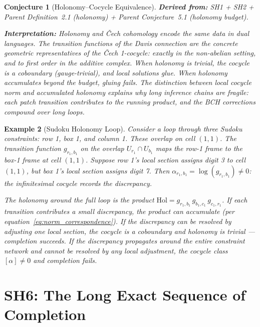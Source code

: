 \documentclass[11pt,letterpaper]{article}
\newtheorem{conjecture}{Conjecture}[section]
\newtheorem{example}[conjecture]{Example}
\newcommand{\Hol}{\mathrm{Hol}}
\begin{document}
\begin{conjecture}[Holonomy--Cocycle 
Equivalence]
\textbf{Derived from:} SH1 + SH2 + Parent Definition~2.1 (holonomy) + 
Parent Conjecture~5.1 (holonomy budget).

\textbf{Interpretation:} Holonomy and \v{C}ech cohomology encode 
\emph{the same data} in dual languages. The transition functions of 
the Davis connection are the concrete geometric representatives of the 
\v{C}ech 1-cocycle: exactly in the non-abelian setting, and to 
first order in the additive complex. When holonomy is trivial, the 
cocycle is a coboundary (gauge-trivial), and local solutions glue. 
When holonomy accumulates beyond the budget, gluing fails. The 
distinction between local cocycle norm and accumulated holonomy 
explains why long inference chains are fragile: each patch 
transition contributes to the running product, and the BCH 
corrections compound over long loops.
\end{conjecture}

\begin{example}[Sudoku Holonomy Loop]
Consider a loop through three Sudoku constraints: row 1, box 1, and 
column 1. These overlap on cell $(1,1)$. The transition function 
$g_{r_1, b_1}$ on the overlap $U_{r_1} \cap U_{b_1}$ maps the 
row-1 frame to the box-1 frame at cell $(1,1)$. Suppose row 1's 
local section assigns digit 3 to cell $(1,1)$, but box 1's local 
section assigns digit 7. Then $\alpha_{r_1, b_1} = \log(g_{r_1,b_1}) 
\neq 0$: the infinitesimal cocycle records the discrepancy.

The holonomy around the full loop is the product 
$\Hol = g_{r_1,b_1} \, g_{b_1,c_1} \, g_{c_1,r_1}$. If each 
transition contributes a small discrepancy, the product can 
accumulate (per equation~\eqref{eq:norm_correspondence}). If the 
discrepancy can be resolved by adjusting one local section, the 
cocycle is a coboundary and holonomy is trivial --- completion 
succeeds. If the discrepancy propagates around the entire constraint 
network and cannot be resolved by any local adjustment, the cocycle 
class $[\alpha] \neq 0$ and completion fails.
\end{example}

\section{SH6: The Long Exact Sequence of Completion}
\end{document}
